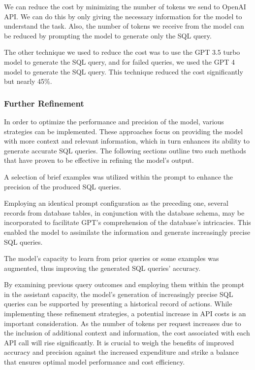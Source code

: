 We can reduce the cost by minimizing the number of tokens we send to OpenAI API. We can do this by only giving the necessary information for the model to understand the task. Also, the number of tokens we receive from the model can be reduced by prompting the model to generate only the SQL query.

The other technique we used to reduce the cost was to use the GPT 3.5 turbo model to generate the SQL query, and for failed queries, we used the GPT 4 model to generate the SQL query. This technique reduced the cost significantly but nearly 45\%.

\subsubsection{Further Refinement}

In order to optimize the performance and precision of the model, various strategies can be implemented. These approaches focus on providing the model with more context and relevant information, which in turn enhances its ability to generate accurate SQL queries. The following sections outline two such methods that have proven to be effective in refining the model's output.


A selection of brief examples was utilized within the prompt to enhance the precision of the produced SQL queries.

Employing an identical prompt configuration as the preceding one, several records from database tables, in conjunction with the database schema, may be incorporated to facilitate GPT's comprehension of the database's intricacies. This enabled the model to assimilate the information and generate increasingly precise SQL queries.


The model's capacity to learn from prior queries or some examples was augmented, thus improving the generated SQL queries' accuracy.

By examining previous query outcomes and employing them within the prompt in the assistant capacity, the model's generation of increasingly precise SQL queries can be supported by presenting a historical record of actions. While implementing these refinement strategies, a potential increase in API costs is an important consideration. As the number of tokens per request increases due to the inclusion of additional context and information, the cost associated with each API call will rise significantly. It is crucial to weigh the benefits of improved accuracy and precision against the increased expenditure and strike a balance that ensures optimal model performance and cost efficiency.

